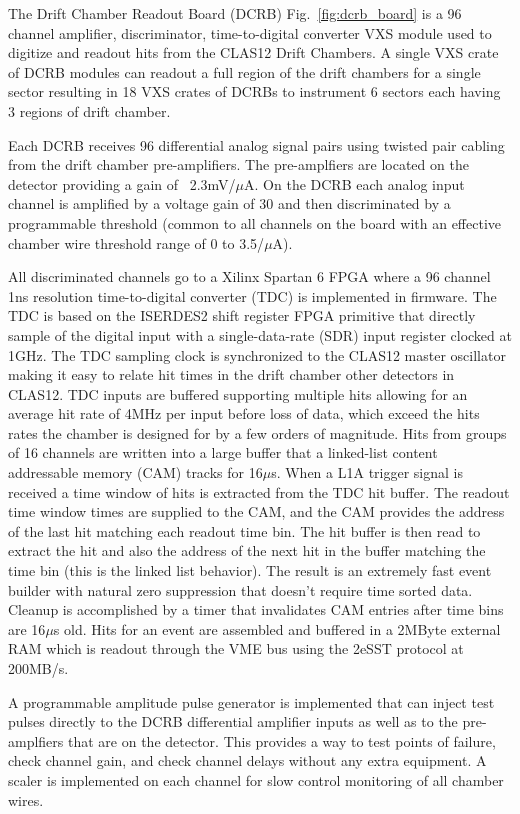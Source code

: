 The Drift Chamber Readout Board (DCRB) Fig.~\ref{fig:dcrb_board} is a 96 channel amplifier, discriminator, time-to-digital converter VXS module used to digitize and readout hits from the CLAS12 Drift Chambers. A single VXS crate of DCRB modules can readout a full region of the drift chambers for a single sector resulting in 18 VXS crates of DCRBs to instrument 6 sectors each having 3 regions of drift chamber.

Each DCRB receives 96 differential analog signal pairs using twisted pair cabling from the drift chamber pre-amplifiers. The pre-amplfiers are located on the detector providing a gain of ~2.3mV/$\mu$A. On the DCRB each analog input channel is amplified by a voltage gain of 30 and then discriminated by a programmable threshold (common to all channels on the board with an effective chamber wire threshold range of 0 to 3.5/$\mu$A).

All discriminated channels go to a Xilinx Spartan 6 FPGA where a 96 channel 1ns resolution time-to-digital converter (TDC) is implemented in firmware. The TDC is based on the ISERDES2 shift register FPGA primitive that directly sample of the digital input with a single-data-rate (SDR) input register clocked at 1GHz. The TDC sampling clock is synchronized to the CLAS12 master oscillator making it easy to relate hit times in the drift chamber other detectors in CLAS12. TDC inputs are buffered supporting multiple hits allowing for an average hit rate of 4MHz per input before loss of data, which exceed the hits rates the chamber is designed for by a few orders of magnitude. Hits from groups of 16 channels are written into a large buffer that a linked-list content addressable memory (CAM) tracks for 16$\mu$s. When a L1A trigger signal is received a time window of hits is extracted from the TDC hit buffer. The readout time window times are supplied to the CAM, and the CAM provides the address of the last hit matching each readout time bin. The hit buffer is then read to extract the hit and also the address of the next hit in the buffer matching the time bin (this is the linked list behavior). The result is an extremely fast event builder with natural zero suppression that doesn't require time sorted data. Cleanup is accomplished by a timer that invalidates CAM entries after time bins are 16$\mu$s old. Hits for an event are assembled and buffered in a 2MByte external RAM which is readout through the VME bus using the 2eSST protocol at 200MB/s.

A programmable amplitude pulse generator is implemented that can inject test pulses directly to the DCRB differential amplifier inputs as well as to the pre-amplfiers that are on the detector. This provides a way to test points of failure, check channel gain, and check channel delays without any extra equipment. A scaler is implemented on each channel for slow control monitoring of all chamber wires.

